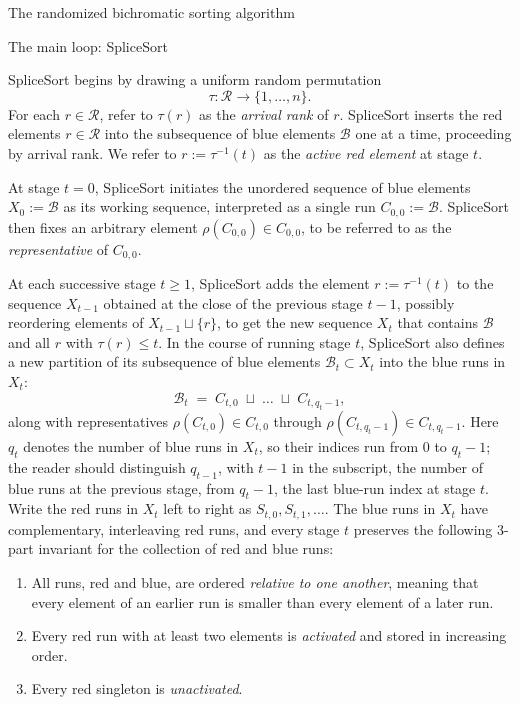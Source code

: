\documentclass[11pt]{article}
\newcommand{\cR}{\mathcal R}
\newcommand{\cB}{\mathcal B}
\theoremstyle{definition}
\numberwithin{equation}{section}
\begin{document}
\begin{section}{The randomized bichromatic sorting algorithm}

\begin{subsection}{The main loop: {\ttfamily SpliceSort}}\label{subsectionL: main loop}
\begin{aiblock}{\ttfamily SpliceSort} begins by drawing a uniform random permutation
$$
\tau:\cR\longrightarrow\{1,\dots,n\}.
$$
For each $r\in\cR$, refer to $\tau(r)$ as the {\em arrival rank} of $r$. {\ttfamily SpliceSort} inserts the red elements $r\in\cR$ into the subsequence of blue elements $\cB$ one at a time, proceeding by arrival rank. We refer to $r := \tau^{-1}(t)$ as the {\em active red element} at stage $t$.

At stage $t=0$, {\ttfamily SpliceSort} initiates the unordered sequence of blue elements $X_0:=\cB$ as its working sequence, interpreted as a single run $C_{0,0}:=\cB$. {\ttfamily SpliceSort} then fixes an arbitrary element $\rho(C_{0,0})\in C_{0,0}$, to be referred to as the {\em representative} of $C_{0,0}$.

At each successive stage $t\ge1$, {\ttfamily SpliceSort} adds the element $r:=\tau^{-1}(t)$ to the sequence $X_{t-1}$ obtained at the close of the previous stage $t-1$, possibly reordering elements of $X_{t-1}\sqcup\{r\}$, to get the new sequence $X_{t}$ that contains $\cB$ and all $r$ with $\tau(r)\le t$. In the course of running stage $t$, {\ttfamily SpliceSort} also defines a new partition of its subsequence of blue elements $\cB_{t}\subset X_{t}$ into the blue runs in $X_{t}$:
$$
\cB_{t}
\;=\;
C_{t,0}\;\sqcup\;\dots\;\sqcup\;C_{t,q_t-1},
$$
along with representatives $\rho(C_{t,0})\in C_{t,0}$ through $\rho(C_{t,q_t-1})\in C_{t,q_t-1}$. Here $q_t$ denotes the number of blue runs in $X_t$, so their indices run from $0$ to $q_t-1$; the reader should distinguish $q_{t-1}$, with $t-1$ in the subscript, the number of blue runs at the previous stage, from $q_t-1$, the last blue-run index at stage $t$. Write the red runs in $X_t$ left to right as $S_{t,0}, S_{t,1}, \dots$. The blue runs in $X_{t}$ have complementary, interleaving red runs, and every stage $t$ preserves the following $3$-part invariant for the collection of red and blue runs:
\begin{enumerate}[label=\textup{(\roman*)}]
\item All runs, red and blue, are ordered {\em relative to one another}, meaning that every element of an earlier run is smaller than every element of a later run.
\item Every red run with at least two elements is {\em activated}
and stored in increasing order.
\item Every red singleton is {\em unactivated}.
\end{enumerate}


\end{aiblock}
\end{subsection}
\end{section}
\end{document}
